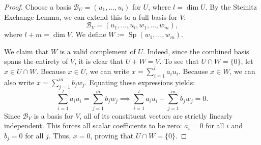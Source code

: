 \begin{proof}
Choose a basis $\mathcal{B}_U = (u_1, \dots, u_l)$ for $U$, where $l = \dim U$. By the Steinitz Exchange Lemma, we can extend this to a full basis for $V$:
\[
\mathcal{B}_V = (u_1, \dots, u_l, w_1, \dots, w_m),
\]
where $l + m = \dim V$. We define $W := \operatorname{Sp}(w_1, \dots, w_m)$. 

We claim that $W$ is a valid complement of $U$. Indeed, since the combined basis spans the entirety of $V$, it is clear that $U + W = V$. To see that $U \cap W = \{0\}$, let $x \in U \cap W$. Because $x \in U$, we can write $x = \sum_{i=1}^l a_i u_i$. Because $x \in W$, we can also write $x = \sum_{j=1}^m b_j w_j$. Equating these expressions yields:
\[
\sum_{i=1}^l a_i u_i = \sum_{j=1}^m b_j w_j \implies \sum_{i=1}^l a_i u_i - \sum_{j=1}^m b_j w_j = 0.
\]
Since $\mathcal{B}_V$ is a basis for $V$, all of its constituent vectors are strictly linearly independent. This forces all scalar coefficients to be zero: $a_i = 0$ for all $i$ and $b_j = 0$ for all $j$. Thus, $x = 0$, proving that $U \cap W = \{0\}$.
\end{proof}